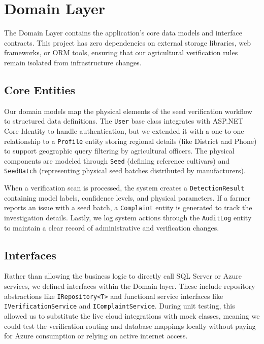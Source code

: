 \section{Domain Layer}
\label{sec:domain-layer}

The Domain Layer contains the application's core data models and interface contracts. This project has zero dependencies on external storage libraries, web frameworks, or ORM tools, ensuring that our agricultural verification rules remain isolated from infrastructure changes.

\subsection{Core Entities}
Our domain models map the physical elements of the seed verification workflow to structured data definitions. The \texttt{User} base class integrates with ASP.NET Core Identity to handle authentication, but we extended it with a one-to-one relationship to a \texttt{Profile} entity storing regional details (like District and Phone) to support geographic query filtering by agricultural officers. The physical components are modeled through \texttt{Seed} (defining reference cultivars) and \texttt{SeedBatch} (representing physical seed batches distributed by manufacturers). 

When a verification scan is processed, the system creates a \texttt{DetectionResult} containing model labels, confidence levels, and physical parameters. If a farmer reports an issue with a seed batch, a \texttt{Complaint} entity is generated to track the investigation details. Lastly, we log system actions through the \texttt{AuditLog} entity to maintain a clear record of administrative and verification changes.

\subsection{Interfaces}
Rather than allowing the business logic to directly call SQL Server or Azure services, we defined interfaces within the Domain layer. These include repository abstractions like \texttt{IRepository<T>} and functional service interfaces like \texttt{IVerificationService} and \texttt{IComplaintService}. During unit testing, this allowed us to substitute the live cloud integrations with mock classes, meaning we could test the verification routing and database mappings locally without paying for Azure consumption or relying on active internet access.

